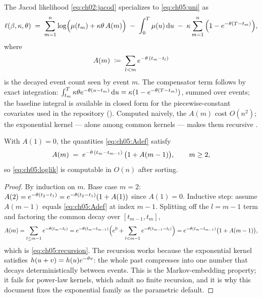 The Jacod likelihood \cref{eq:ch02:jacod} specializes to
\cref{eq:ch05:uni} as
\begin{equation}\label{eq:ch05:loglik}
\ell(\beta, \kappa, \theta)
\;=\;
\sum_{m=1}^{n} \log\!\Big(\mu(t_m) + \kappa\theta\, A(m)\Big)
\;-\; \int_0^{T} \mu(u)\,\mathrm{d} u
\;-\; \kappa \sum_{m=1}^{n} \Big(1 - e^{-\theta(T - t_m)}\Big),
\end{equation}
where
\begin{equation}\label{eq:ch05:Adef}
A(m) \;\coloneqq\; \sum_{l < m} e^{-\theta\,(t_m - t_l)}
\end{equation}
is the decayed event count seen by event $m$. The compensator term follows
by exact integration: $\int_{t_m}^{T} \kappa\theta
e^{-\theta(u-t_m)}\,\mathrm{d} u = \kappa(1 - e^{-\theta(T-t_m)})$, summed
over events; the baseline integral is available in closed form for the
piecewise-constant covariates used in the repository
(). Computed naively, the $A(m)$ cost
$O(n^2)$; the exponential kernel --- alone among common kernels --- makes
them recursive \citep{ozaki1979}.

\begin{proposition}\label{prop:ch05:recursion}
With $A(1) = 0$, the quantities \cref{eq:ch05:Adef} satisfy
\begin{equation}\label{eq:ch05:recursion}
A(m) \;=\; e^{-\theta\,(t_m - t_{m-1})}\,\big(1 + A(m-1)\big),
\qquad m \ge 2,
\end{equation}
so \cref{eq:ch05:loglik} is computable in $O(n)$ after sorting.
\end{proposition}

\begin{proof}
By induction on $m$. Base case $m=2$: $A(2) = e^{-\theta(t_2-t_1)} =
e^{-\theta(t_2-t_1)}(1 + A(1))$ since $A(1)=0$. Inductive step: assume
$A(m-1)$ equals \cref{eq:ch05:Adef} at index $m-1$. Splitting off the
$l=m-1$ term and factoring the common decay over $[t_{m-1}, t_m]$,
\[
A(m)
= \sum_{l \le m-1} e^{-\theta(t_m - t_l)}
= e^{-\theta(t_m - t_{m-1})}\Big(e^{0} + \sum_{l < m-1}
e^{-\theta(t_{m-1} - t_l)}\Big)
= e^{-\theta(t_m - t_{m-1})}\big(1 + A(m-1)\big),
\]
which is \cref{eq:ch05:recursion}. The recursion works because the
exponential kernel satisfies $h(u+v) = h(u)e^{-\theta v}$:
the whole past compresses into one number that decays deterministically
between events. This is the Markov-embedding property; it fails for
power-law kernels, which admit no finite recursion, and it is why this
document fixes the exponential family as the parametric default.
\end{proof}

